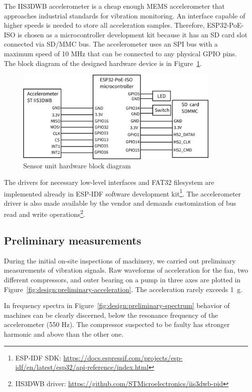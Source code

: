 The IIS3DWB accelerometer is a cheap enough MEMS accelerometer that approaches industrial standards for vibration monitoring. An interface capable of higher speeds is needed to store all acceleration samples. Therefore, ESP32-PoE-ISO is chosen as a microcontroller development kit because it has an SD card slot connected via SD/MMC bus. The accelerometer uses an SPI bus with a maximum speed of 10 MHz that can be connected to any physical GPIO pins. The block diagram of the designed hardware device is in Figure~\ref{fig:design:block-diagram-hw}.


\begin{figure}[h]
	\centering
	\includegraphics[width=0.9\textwidth]{assets/design/hw-block-schematic.png}
	\caption{Sensor unit hardware block diagram}
	\label{fig:design:block-diagram-hw}
\end{figure}

The drivers for necessary low-level interfaces and FAT32 filesystem are  implemented already in ESP-IDF software development kit\footnote{ESP-IDF SDK: \url{https://docs.espressif.com/projects/esp-idf/en/latest/esp32/api-reference/index.html}}. The accelerometer driver is also made available by the vendor and demands customization of bus read and write operations\footnote{IIS3DWB driver: \url{https://github.com/STMicroelectronics/iis3dwb-pid}}.

\subsection{Preliminary measurements}
During the initial on-site inspections of machinery, we carried out preliminary measurements of vibration signals. Raw waveforms of acceleration for the fan, two different compressors, and outer bearing on a pump in three axes are plotted in Figure~\ref{fig:design:preliminary-acceleration}. The acceleration rarely exceeds 1~g. 

In frequency spectra in Figure~\ref{fig:design:preliminary-spectrum} behavior of machines can be clearly discerned, below the resonance frequency of the accelerometer (550 Hz). The compressor suspected to be faulty has stronger  harmonic and above than the other one.


